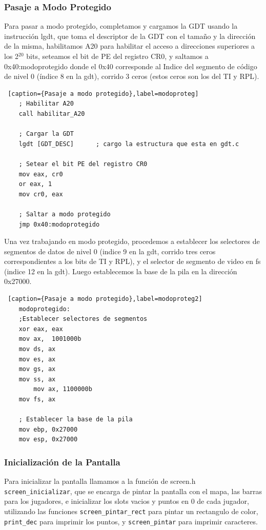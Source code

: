 \subsubsection*{Pasaje a Modo Protegido}

\par Para pasar a modo protegido, completamos y cargamos la GDT usando la instrucción lgdt, que toma el descriptor de la GDT con el tamaño y la dirección de la misma, habilitamos A20 para habilitar el acceso a direcciones superiores a los 2$^{20}$ bits, seteamos el bit de PE del registro CR0, y saltamos a 0x40:modoprotegido donde el 0x40 corresponde al Indice del segmento de código de nivel 0 (índice 8 en la gdt), corrido 3 ceros (estos ceros son los del TI y RPL).

\begin{lstlisting} [caption={Pasaje a modo protegido},label=modoproteg]
    ; Habilitar A20
    call habilitar_A20  
   
    ; Cargar la GDT
	lgdt [GDT_DESC]      ; cargo la estructura que esta en gdt.c

    ; Setear el bit PE del registro CR0
    mov eax, cr0
	or eax, 1
	mov cr0, eax

    ; Saltar a modo protegido
	jmp 0x40:modoprotegido
\end{lstlisting}


\par Una vez trabajando en modo protegido, procedemos a establecer los selectores de segmentos de datos de nivel 0 (indice 9 en la gdt, corrido tres ceros correspondientes a los bits de TI y RPL), y el selector de segmento de video en fs (indice 12 en la gdt). Luego establecemos la base de la pila en la dirección 0x27000.


\begin{lstlisting} [caption={Pasaje a modo protegido},label=modoproteg2]
    modoprotegido:
    ;Establecer selectores de segmentos
    xor eax, eax
	mov ax,  1001000b
	mov ds, ax
	mov es, ax
	mov gs, ax
	mov ss, ax
    	mov ax, 1100000b
    mov fs, ax

    ; Establecer la base de la pila
	mov ebp, 0x27000
	mov esp, 0x27000
\end{lstlisting}

\subsubsection*{Inicialización de la Pantalla}

\par Para inicializar la pantalla llamamos a la función de screen.h \texttt{screen_inicializar}, que se encarga de pintar la pantalla con el mapa, las barras para los jugadores, e inicializar los slots vacios y puntos en 0 de cada jugador, utilizando las funciones \texttt{screen_pintar_rect} para pintar un rectangulo de color, \texttt{print_dec} para imprimir los puntos, y \texttt{screen_pintar} para imprimir caracteres.

